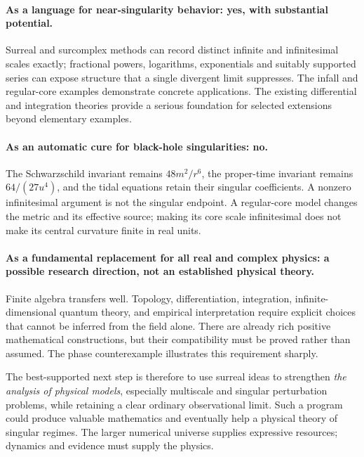 \documentclass[11pt,a4paper]{article}
\numberwithin{equation}{section}
\theoremstyle{definition}
\theoremstyle{remark}
\begin{document}
\paragraph{As a language for near-singularity behavior: yes, with substantial potential.}
Surreal and surcomplex methods can record distinct infinite and infinitesimal
scales exactly; fractional powers, logarithms, exponentials and suitably
supported series can expose structure that a single divergent limit suppresses.
The infall and regular-core examples demonstrate concrete applications. The
existing differential and integration theories provide a serious foundation
for selected extensions beyond elementary examples.

\paragraph{As an automatic cure for black-hole singularities: no.}
The Schwarzschild invariant remains $48m^2/r^6$, the proper-time invariant
remains $64/(27u^4)$, and the tidal equations retain their singular coefficients.
A nonzero infinitesimal argument is not the singular endpoint. A regular-core
model changes the metric and its effective source; making its core scale
infinitesimal does not make its central curvature finite in real units.

\paragraph{As a fundamental replacement for all real and complex physics: a
possible research direction, not an established physical theory.}
Finite algebra transfers well. Topology, differentiation, integration,
infinite-dimensional quantum theory, and empirical interpretation require
explicit choices that cannot be inferred from the field alone. There are
already rich positive mathematical constructions, but their compatibility
must be proved rather than assumed. The phase counterexample illustrates this
requirement sharply.

The best-supported next step is therefore to use surreal ideas to strengthen
\emph{the analysis of physical models}, especially multiscale and singular
perturbation problems, while retaining a clear ordinary observational limit.
Such a program could produce valuable mathematics and eventually help a
physical theory of singular regimes. The larger numerical universe supplies
expressive resources; dynamics and evidence must supply the physics.

\clearpage
\appendix
\end{document}
